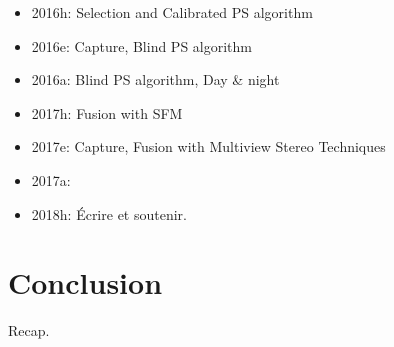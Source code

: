 \documentclass{report}
\begin{document}
\begin{itemize}
	\item 2016h: Selection and Calibrated PS algorithm
	\item 2016e: Capture, Blind PS algorithm  
	\item 2016a: Blind PS algorithm, Day \& night
	\item 2017h: Fusion with SFM
	\item 2017e: Capture, Fusion with Multiview Stereo Techniques
	\item 2017a: 
	\item 2018h: Écrire et soutenir.
\end{itemize}


\chapter{Conclusion}\label{conclusion}

Recap.

{\small
%

}
\end{document}
